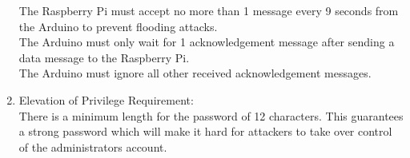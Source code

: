 \begin{enumerate}[label*=\arabic*.]
        The Raspberry Pi must accept no more than 1 message every 9 seconds from the Arduino to prevent flooding attacks. \\
        The Arduino must only wait for 1 acknowledgement message after sending a data message to the Raspberry Pi.\\
        The Arduino must ignore all other received acknowledgement messages.\\
        \item \label{sreq.2} Elevation of Privilege Requirement:  \\
        There is a minimum length for the password of 12 characters. This guarantees a strong password which will make it hard for attackers to take over control of the administrators account.\\ 
    \end{enumerate}         



